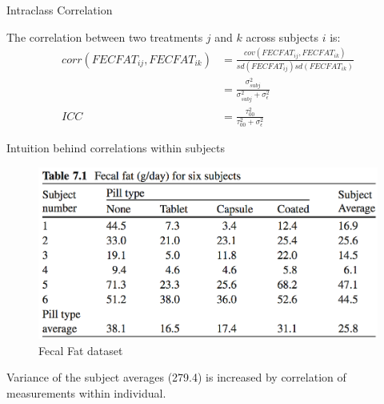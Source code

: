 \documentclass[
  ignorenonframetext,
]{beamer}
\begin{document}
\begin{frame}{Intraclass Correlation}
\protect\hypertarget{intraclass-correlation}{}

The correlation between two treatments \(j\) and \(k\) across subjects
\(i\) is: \begin{equation*}
\begin{aligned}
corr(FECFAT_{ij}, FECFAT_{ik}) & = 
          \frac{cov(FECFAT_{ij}, FECFAT_{ik})}
               {sd(FECFAT_{ij}) sd(FECFAT_{ik})} \\
      & = \frac{\sigma_{subj}^2}{\sigma_{subj}^2 + \sigma_{\epsilon}^2} \\
ICC & = \frac{\tau_{00}^2}{\tau_{00}^2 + \sigma_\epsilon^2}
\end{aligned}
\end{equation*}

\end{frame}

\begin{frame}{Intuition behind correlations within subjects}
\protect\hypertarget{intuition-behind-correlations-within-subjects}{}

\begin{figure}
\centering
\includegraphics{VittinghoffTable71.png}
\caption{Fecal Fat dataset}
\end{figure}

\footnotesize

Variance of the subject averages (279.4) is increased by correlation of
measurements within individual.

\end{frame}
\end{document}
